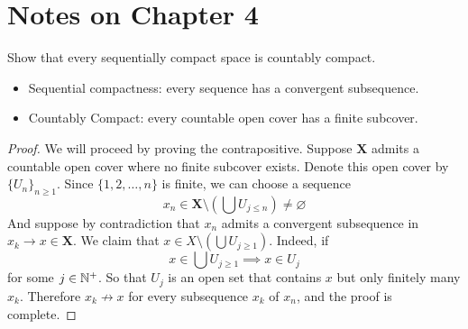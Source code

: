 \documentclass[../../main.tex]{subfiles}
\begin{document}
\providecommand{\szz}{\mathcal{S}}
\providecommand{\ccinf}{C_c^\infty}
\section*{Notes on Chapter 4}
\begin{wts}
    Show that every sequentially compact space is countably compact. \begin{itemize}
    \item Sequential compactness: every sequence has a convergent subsequence.
    \item Countably Compact: every countable open cover has a finite subcover.
    \end{itemize}
\end{wts}
\providecommand{\xx}{\mathbf{X}}
\begin{proof}
    We will proceed by proving the contrapositive. Suppose $\xx$ admits a countable open cover where no finite subcover exists. Denote this open cover by $\{U_n\}_{n\geq 1}$. Since $\{1,2,\ldots,n\}$ is finite, we can choose a sequence 
    \[x_n\in \xx\setminus \left(\bigcup U_{j\leq n}\right)\neq\varnothing\]
    And suppose by contradiction that $x_n$ admits a convergent subsequence in $x_k\to x\in \xx$. We claim that $x\in X\setminus\left(\bigcup U_{j\geq 1}\right)$. Indeed, if\[x\in \bigcup U_{j\geq 1}\implies x\in U_j\]
    for some $j\in \mathbb{N}^+$. So that $U_j$ is an open set that contains $x$ but only finitely many $x_k$. Therefore $x_k\not\to x$ for every subsequence $x_k$ of $x_n$, and the proof is complete.
\end{proof}\newpage
\end{document}
